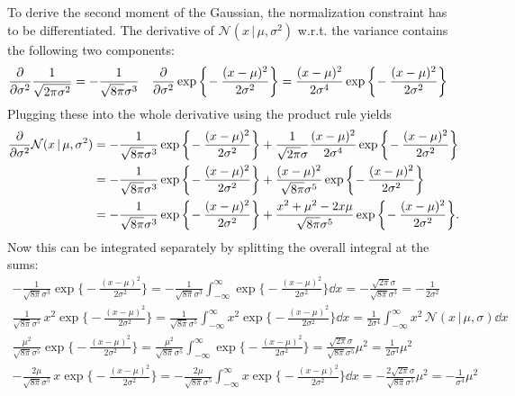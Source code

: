 \documentclass[11pt, a4paper]{scrartcl}
\newcommand{\normal}{\mathcal{N}}
\newcommand{\given}{\,\vert\,}
\begin{document}
			To derive the second moment of the Gaussian, the normalization constraint has to be differentiated. The derivative of \( \normal(x \given \mu, \sigma^2) \) w.r.t. the variance contains the following two components:
			\begin{align}
				\pdv{\sigma^2} \frac{1}{\sqrt{2 \pi \sigma^2}}
					&= -\frac{1}{\sqrt{8 \pi} \sigma^3} &
				\pdv{\sigma^2} \exp\bigg\{\! -\frac{(x - \mu)^2}{2 \sigma^2} \bigg\}
					&= \frac{(x - \mu)^2}{2 \sigma^4} \exp\bigg\{\! -\frac{(x - \mu)^2}{2 \sigma^2} \bigg\}
			\end{align}
			Plugging these into the whole derivative using the product rule yields
			\begin{align}
				\pdv{\sigma^2} \normal(x \given \mu, \sigma^2)
					&= -\frac{1}{\sqrt{8 \pi} \sigma^3} \exp\bigg\{\! -\frac{(x - \mu)^2}{2 \sigma^2} \bigg\}
					 + \frac{1}{\sqrt{2 \pi} \sigma} \frac{(x - \mu)^2}{2 \sigma^4} \exp\bigg\{\! -\frac{(x - \mu)^2}{2 \sigma^2} \bigg\} \\
					&= -\frac{1}{\sqrt{8 \pi} \sigma^3} \exp\bigg\{\! -\frac{(x - \mu)^2}{2 \sigma^2} \bigg\}
					 + \frac{(x - \mu)^2}{\sqrt{8 \pi} \sigma^5} \exp\bigg\{\! -\frac{(x - \mu)^2}{2 \sigma^2} \bigg\} \\
					&= -\frac{1}{\sqrt{8 \pi} \sigma^3} \exp\bigg\{\! -\frac{(x - \mu)^2}{2 \sigma^2} \bigg\}
					 + \frac{x^2 + \mu^2 - 2x\mu}{\sqrt{8 \pi} \sigma^5} \exp\bigg\{\! -\frac{(x - \mu)^2}{2 \sigma^2} \bigg\}.
			\end{align}
			Now this can be integrated separately by splitting the overall integral at the sums:
			\begin{gather}
				-\frac{1}{\sqrt{8 \pi} \sigma^3} \exp\bigg\{\! -\frac{(x - \mu)^2}{2 \sigma^2} \bigg\}
					= -\frac{1}{\sqrt{8 \pi} \sigma^3} \int_{-\infty}^{\infty}\! \exp\bigg\{\! -\frac{(x - \mu)^2}{2 \sigma^2} \bigg\} \dd{x}
					= -\frac{\sqrt{2 \pi} \sigma}{\sqrt{8 \pi} \sigma^3}
					= -\frac{1}{2 \sigma^2} \\
				\frac{1}{\sqrt{8 \pi} \sigma^5} \, x^2 \exp\bigg\{\! -\frac{(x - \mu)^2}{2 \sigma^2} \bigg\}
					= \frac{1}{\sqrt{8 \pi} \sigma^5} \int_{-\infty}^{\infty}\! x^2 \exp\bigg\{\! -\frac{(x - \mu)^2}{2 \sigma^2} \bigg\} \dd{x}
					= \frac{1}{2 \sigma^4} \int_{-\infty}^{\infty}\! x^2 \, \normal(x \given \mu, \sigma) \dd{x} \\
				\frac{\mu^2}{\sqrt{8 \pi} \sigma^5} \exp\bigg\{\! -\frac{(x - \mu)^2}{2 \sigma^2} \bigg\}
					= \frac{\mu^2}{\sqrt{8 \pi} \sigma^5} \int_{-\infty}^{\infty}\! \exp\bigg\{\! -\frac{(x - \mu)^2}{2 \sigma^2} \bigg\}
					= \frac{\sqrt{2 \pi} \sigma}{\sqrt{8 \pi} \sigma^5} \mu^2
					= \frac{1}{2 \sigma^4} \mu^2 \\
				-\frac{2\mu}{\sqrt{8 \pi} \sigma^5} \, x \exp\bigg\{\! -\frac{(x - \mu)^2}{2 \sigma^2} \bigg\}
					= -\frac{2\mu}{\sqrt{8 \pi} \sigma^5} \int_{-\infty}^{\infty}\! x \exp\bigg\{\! -\frac{(x - \mu)^2}{2 \sigma^2} \bigg\} \dd{x}
					= -\frac{2\sqrt{2 \pi} \sigma}{\sqrt{8 \pi} \sigma^5} \mu^2
					= -\frac{1}{\sigma^4} \mu^2
			\end{gather}
\end{document}
